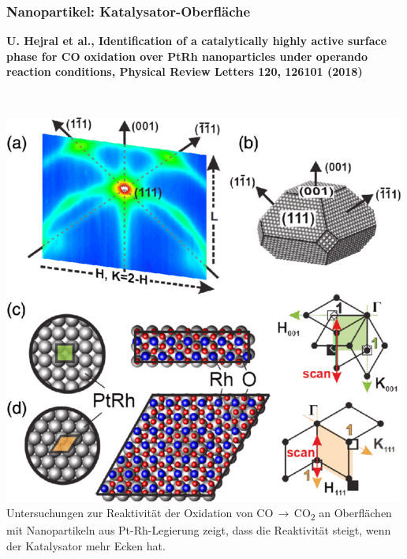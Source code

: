 \documentclass[10pt,t]{beamer}
\begin{document}
\begin{frame}
\begin{columns}
\end{columns}
\vspace*{-7pt}
\end{frame}


\begin{frame}
\frametitle{Nanopartikel: Katalysator-Oberfläche}
\vspace*{-2.6\baselineskip}
\alert{\bfseries\footnotesize U. Hejral et al., Identification of a catalytically highly active surface phase for CO oxidation over PtRh nanoparticles under operando reaction conditions, Physical Review Letters 120, 126101 (2018) \cite{Hejral2018}}
\vspace*{\baselineskip}
\begin{columns}
        ~\\[-\baselineskip]
        \includegraphics[width=\textwidth]{nano-methode}
        Untersuchungen zur Reaktivität der Oxidation von
        CO\,$\rightarrow$\,CO\textsubscript{2} an Oberflächen mit Nanopartikeln
        aus Pt-Rh-Legierung zeigt, dass die Reaktivität steigt, wenn der
        Katalysator mehr Ecken hat.
        \vspace*{1ex}

\end{columns}
\end{frame}
\end{document}

